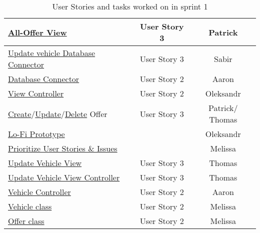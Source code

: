 \begin{table}[h]
    \centering
    \caption{\label{tab:user-stroies-sprint-1}User Stories and tasks worked on in sprint 1}
\begin{tabular}{|l|c|c|}
	\hline
	\href{https://gitlab.rz.uni-bamberg.de/swt/teaching/2021-ws/swt-swl-b/group-a/-/issues/28}{All-Offer View} & User Story 3 & Patrick \\
	\hline
	\href{https://gitlab.rz.uni-bamberg.de/swt/teaching/2021-ws/swt-swl-b/group-a/-/issues/27}{Update vehicle Database Connector} & User Story 3 & Sabir \\
	\hline
	\href{https://gitlab.rz.uni-bamberg.de/swt/teaching/2021-ws/swt-swl-b/group-a/-/issues/24}{Database Connector} & User Story 2 & Aaron \\
	\hline
	\href{https://gitlab.rz.uni-bamberg.de/swt/teaching/2021-ws/swt-swl-b/group-a/-/issues/23}{View Controller} & User Story 2 & Oleksandr \\
	\hline
	\href{https://gitlab.rz.uni-bamberg.de/swt/teaching/2021-ws/swt-swl-b/group-a/-/issues/41}{Create}/\href{https://gitlab.rz.uni-bamberg.de/swt/teaching/2021-ws/swt-swl-b/group-a/-/issues/34}{Update}/\href{https://gitlab.rz.uni-bamberg.de/swt/teaching/2021-ws/swt-swl-b/group-a/-/issues/35}{Delete} Offer & User Story 3 & Patrick/ Thomas \\
	\hline
	\href{https://gitlab.rz.uni-bamberg.de/swt/teaching/2021-ws/swt-swl-b/group-a/-/issues/37}{Lo-Fi Prototype} &  & Oleksandr \\
	\hline
	\href{https://gitlab.rz.uni-bamberg.de/swt/teaching/2021-ws/swt-swl-b/group-a/-/issues/19}{Prioritize User Stories \& Issues} &  & Melissa \\
	\hline
	\href{https://gitlab.rz.uni-bamberg.de/swt/teaching/2021-ws/swt-swl-b/group-a/-/issues/25}{Update Vehicle View} & User Story 3 & Thomas \\
	\hline
	\href{https://gitlab.rz.uni-bamberg.de/swt/teaching/2021-ws/swt-swl-b/group-a/-/issues/26}{Update Vehicle View Controller} & User Story 3 & Thomas \\
	\hline
	\href{https://gitlab.rz.uni-bamberg.de/swt/teaching/2021-ws/swt-swl-b/group-a/-/issues/21}{Vehicle Controller} & User Story 2 & Aaron \\
	\hline
	\href{https://gitlab.rz.uni-bamberg.de/swt/teaching/2021-ws/swt-swl-b/group-a/-/issues/20}{Vehicle class} & User Story 2 & Melissa \\
	\hline
	\href{https://gitlab.rz.uni-bamberg.de/swt/teaching/2021-ws/swt-swl-b/group-a/-/issues/30}{Offer class} & User Story 2 & Melissa \\

\end{tabular}
\end{table}

